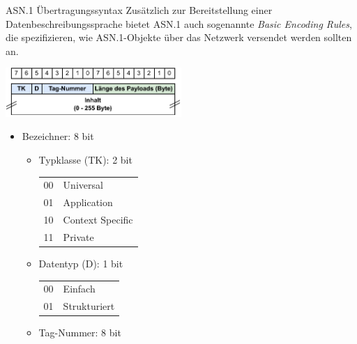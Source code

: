 \begin{defi}{ASN.1 Übertragungssyntax}
    Zusätzlich zur Bereitstellung einer Datenbeschreibungssprache bietet ASN.1 auch sogenannte \emph{Basic Encoding Rules}, die spezifizieren, wie ASN.1-Objekte über das Netzwerk versendet werden sollten an.

    \begin{center}
        \includegraphics[width=0.5\textwidth]{includes/figures/defi_asn1.pdf}
    \end{center}

    \begin{itemize}
        \item Bezeichner: 8 bit

              \begin{itemize}
                  \item Typklasse (TK): 2 bit

                        \begin{tabular}{T|l}
                            00 & Universal        \\
                            01 & Application      \\
                            10 & Context Specific \\
                            11 & Private
                        \end{tabular}
                  \item Datentyp (D): 1 bit

                        \begin{tabular}{T|l}
                            00 & Einfach      \\
                            01 & Strukturiert
                        \end{tabular}
                  \item Tag-Nummer: 8 bit


\end{itemize}
\end{itemize}
\end{defi}
